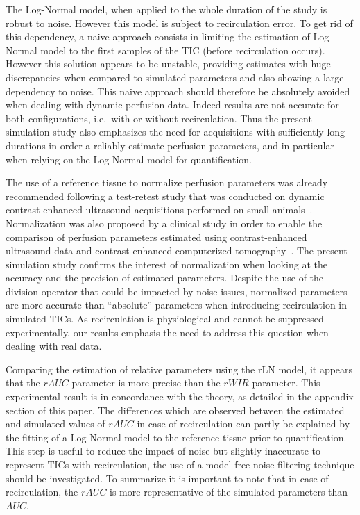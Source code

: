 The Log-Normal model, when applied to the whole duration of the study is robust to noise. However this model is subject to recirculation error. To get rid of this dependency, a naive approach consists in limiting the estimation of Log-Normal model to the first samples of the TIC (before recirculation occurs). However this solution appears to be unstable, providing estimates with huge discrepancies when compared to simulated parameters and also showing a large dependency to noise. This naive approach should therefore be absolutely avoided when dealing with dynamic perfusion data. Indeed results are not accurate for both configurations, i.e.~with or without recirculation. Thus the present simulation study also emphasizes the need for acquisitions with sufficiently long durations in order a reliably estimate perfusion parameters, and in particular when relying on the Log-Normal model for quantification. 

The use of a reference tissue to normalize perfusion parameters was already recommended following a test-retest study that was conducted on dynamic contrast-enhanced ultrasound acquisitions performed on small animals~\cite{Doury2017wn}. Normalization was also proposed by a clinical study in order to enable the comparison of perfusion parameters estimated using contrast-enhanced ultrasound data and contrast-enhanced computerized tomography~\cite{Lefort2012}. The present simulation study confirms the interest of normalization when looking at the accuracy and the precision of estimated parameters. Despite the use of the division operator that could be impacted by noise issues, normalized parameters are more accurate than ``absolute'' parameters when introducing recirculation in simulated TICs. As recirculation is physiological and cannot be suppressed experimentally, our results emphasis the need to address this question when dealing with real data.

Comparing the estimation of relative parameters using the rLN model, it appears that the $rAUC$ parameter is more precise than the $rWIR$ parameter. This experimental result is in concordance with the theory, as detailed in the appendix section of this paper. The differences which are observed between the estimated and simulated values of $rAUC$ in case of recirculation can partly be explained by the fitting of a Log-Normal model to the reference tissue prior to quantification. This step is useful to reduce the impact of noise but slightly inaccurate to represent TICs with recirculation, the use of a model-free noise-filtering technique should be investigated. To summarize it is important to note that in case of recirculation, the $rAUC$ is more representative of the simulated parameters than $AUC$.

